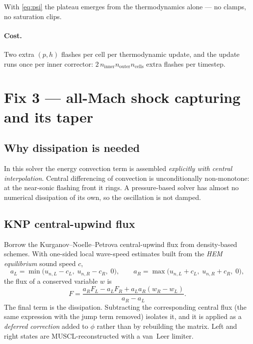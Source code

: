 \documentclass[11pt,a4paper]{article}
\begin{document}
With \eqref{eq:psi} the plateau emerges from the thermodynamics alone --- no
clamps, no saturation clips.

\paragraph{Cost.} Two extra $(p,h)$ flashes per cell per thermodynamic update,
and the update runs once per inner corrector: $2\,n_{\text{inner}}
n_{\text{outer}} n_{\text{cells}}$ extra flashes per timestep.

\section{Fix 3 --- all-Mach shock capturing and its taper}\label{sec:knp}

\subsection{Why dissipation is needed}

In this solver the energy convection term is assembled \emph{explicitly with
central interpolation}. Central differencing of convection is unconditionally
non-monotone: at the near-sonic flashing front it rings. A pressure-based
solver has almost no numerical dissipation of its own, so the oscillation is not
damped.

\subsection{KNP central-upwind flux}

Borrow the Kurganov--Noelle--Petrova central-upwind flux from density-based
schemes. With one-sided local wave-speed estimates built from the \emph{HEM
equilibrium} sound speed $c$,
\begin{equation}
  a_L = \min\big(u_{n,L}-c_L,\; u_{n,R}-c_R,\; 0\big),
  \qquad
  a_R = \max\big(u_{n,L}+c_L,\; u_{n,R}+c_R,\; 0\big),
\end{equation}
the flux of a conserved variable $w$ is
\begin{equation}
  F = \frac{a_R F_L - a_L F_R + a_L a_R (w_R - w_L)}{a_R - a_L}.
  \label{eq:knp}
\end{equation}
The final term is the dissipation. Subtracting the corresponding central flux
(the same expression with the jump term removed) isolates it, and it is applied
as a \emph{deferred correction} added to $\phi$ rather than by rebuilding the
matrix. Left and right states are MUSCL-reconstructed with a van~Leer limiter.
\end{document}

